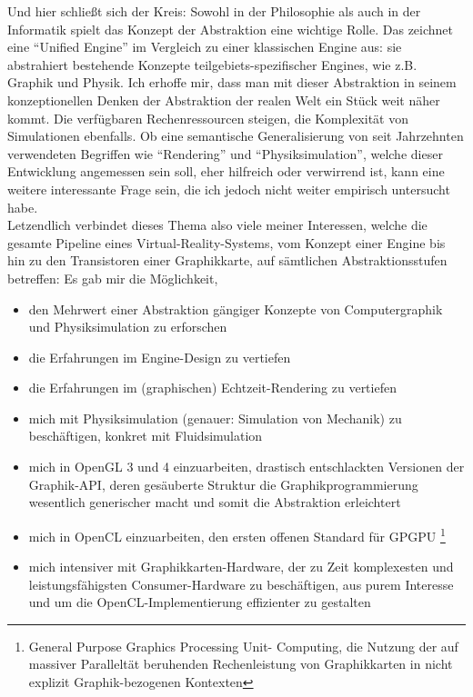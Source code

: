 Und hier schließt sich der Kreis: Sowohl in der Philosophie als auch in der Informatik spielt das Konzept der Abstraktion eine wichtige Rolle. Das zeichnet eine "`Unified Engine"' im Vergleich zu einer klassischen Engine aus:
sie abstrahiert bestehende Konzepte teilgebiets-spezifischer Engines, wie z.B. Graphik und Physik. Ich erhoffe mir, dass man mit dieser Abstraktion in seinem konzeptionellen Denken der Abstraktion der realen Welt ein Stück weit näher kommt.
Die verfügbaren Rechenressourcen steigen, die Komplexität von Simulationen ebenfalls. Ob eine semantische Generalisierung von seit Jahrzehnten verwendeten Begriffen wie "`Rendering"' und "`Physiksimulation"', welche dieser Entwicklung angemessen sein soll, eher hilfreich oder verwirrend ist, kann eine weitere interessante Frage sein, die ich jedoch nicht weiter empirisch untersucht habe.\\

Letzendlich verbindet dieses Thema also viele meiner Interessen, welche die gesamte Pipeline eines Virtual-Reality-Systems,  vom Konzept einer Engine bis hin zu den Transistoren einer Graphikkarte, auf sämtlichen Abstraktionsstufen betreffen: Es gab mir die Möglichkeit,

\begin{itemize}
	\label{list:didacticGoals}
	\item den Mehrwert einer Abstraktion gängiger Konzepte von Computergraphik und Physiksimulation zu erforschen
	\item die Erfahrungen im Engine-Design zu vertiefen
	\item die Erfahrungen im (graphischen) Echtzeit-Rendering zu vertiefen
	\item mich mit Physiksimulation (genauer: Simulation von Mechanik) zu beschäftigen, konkret mit Fluidsimulation
	
	\item mich in OpenGL 3 und 4 einzuarbeiten, drastisch entschlackten Versionen der Graphik-API, deren gesäuberte Struktur die Graphikprogrammierung wesentlich generischer macht und somit die Abstraktion erleichtert
	\item mich in OpenCL einzuarbeiten, den ersten offenen Standard für GPGPU
		\footnote{General Purpose Graphics Processing Unit- Computing, die Nutzung der auf massiver Paralleltät beruhenden 
			Rechenleistung von Graphikkarten in nicht explizit Graphik-bezogenen Kontexten}
	\item  mich intensiver mit Graphikkarten-Hardware, der zu Zeit komplexesten und leistungsfähigsten 
		Consumer-Hardware zu beschäftigen, aus purem Interesse und um die OpenCL-Implementierung effizienter zu gestalten
\end{itemize}

